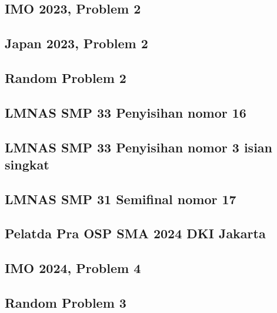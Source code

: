 \subsection{IMO 2023, Problem 2}
 

\subsection{Japan 2023, Problem 2}


\subsection{Random Problem 2}


\subsection{LMNAS SMP 33 Penyisihan nomor 16}


\subsection{LMNAS SMP 33 Penyisihan nomor 3 isian singkat}


\subsection{LMNAS SMP 31 Semifinal nomor 17}


\subsection{Pelatda Pra OSP SMA 2024 DKI Jakarta}


\subsection{IMO 2024, Problem 4}


\subsection{Random Problem 3}


